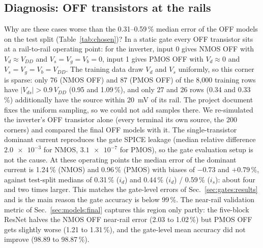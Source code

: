 \subsection{Diagnosis: OFF transistors at the rails}\label{sec:errors:diag}
Why are these cases worse than the 0.31--0.59\,\% median error of the OFF models on the test split (Table~\ref{tab:chosen})? In a static gate every OFF transistor sits at a rail-to-rail operating point: for the inverter, input 0 gives NMOS OFF with $V_d\approx V_{DD}$ and $V_s=V_g=V_b=0$, input 1 gives PMOS OFF with $V_d\approx0$ and $V_s=V_g=V_b=V_{DD}$. The training data draw $V_d$ and $V_s$ uniformly, so this corner is sparse: only 76 (NMOS OFF) and 87 (PMOS OFF) of the 8,000 training rows have $|V_{ds}|>0.9\,V_{DD}$ (0.95 and 1.09\,\%), and only 27 and 26 rows (0.34 and 0.33\,\%) additionally have the source within \SI{20}{\milli\volt} of its rail. The project document fixes the uniform sampling, so we could not add samples there.
We re-simulated the inverter's OFF transistor alone (every terminal its own source, the 200 corners) and compared the final OFF models with it. The single-transistor dominant current reproduces the gate SPICE leakage (median relative difference $\num{2.0e-3}$ for NMOS, $\num{3.1e-7}$ for PMOS), so the gate evaluation setup is not the cause. At these operating points the median error of the dominant current is 1.24\,\% (NMOS) and 0.96\,\% (PMOS) with biases of $-0.73$ and $+0.79\,\%$, against test-split medians of 0.31\,\% ($i_d$) and 0.44\,\% ($i_d$) / 0.59\,\% ($i_s$): about four and two times larger. This matches the gate-level errors of Sec.~\ref{sec:gates:results} and is the main reason the gate accuracy is below 99\,\%. The near-rail validation metric of Sec.~\ref{sec:models:final} captures this region only partly: the five-block ResNet halves the NMOS OFF near-rail error (2.03 to 1.02\,\%) but PMOS OFF gets slightly worse (1.21 to 1.31\,\%), and the gate-level mean accuracy did not improve (98.89 to 98.87\,\%).
